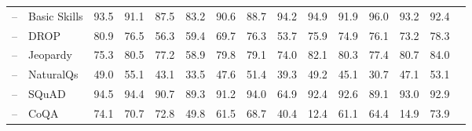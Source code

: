 \documentclass[table]{ai2style/ai2}
\begin{document}
\begin{table}[t]
{{\begin{NiceTabular}{@{}Hl
P{38pt}C{38pt}C{38pt}C{38pt}C{38pt}C{38pt}|C{38pt}C{38pt}C{38pt}C{38pt}C{38pt}C{38pt}H@{}}
 -- & Basic Skills                                                                                           & 93.5                    & 91.1               & 87.5                 & 83.2                 & 90.6                       & 88.7                  & 94.2                  & 94.9                 & 91.9                     & 96.0              & 93.2                 & 92.4                   \\
 -- & DROP                                                                                                   & 80.9                    & 76.5               & 56.3                 & 59.4                 & 69.7                       & 76.3                  & 53.7                  & 75.9                 & 74.9                     & 76.1              & 73.2                 & 78.3                   \\
 -- & Jeopardy                                                                                               & 75.3                    & 80.5               & 77.2                 & 58.9                 & 79.8                       & 79.1                  & 74.0                  & 82.1                 & 80.3                     & 77.4              & 80.7                 & 84.0                   \\
 -- & NaturalQs                                                                                              & 49.0                    & 55.1               & 43.1                 & 33.5                 & 47.6                       & 51.4                  & 39.3                  & 49.2                 & 45.1                     & 30.7              & 47.1                 & 53.1                   \\
 -- & SQuAD                                                                                                  & 94.5                    & 94.4               & 90.7                 & 89.3                 & 91.2                       & 94.0                  & 64.9                  & 92.4                 & 92.6                     & 89.1              & 93.0                 & 92.9                   \\
 -- & CoQA                                                                                                   & 74.1                    & 70.7               & 72.8                 & 49.8                 & 61.5                       & 68.7                  & 40.4                  & 12.4                 & 61.1                     & 64.4              & 14.9                 & 73.9                   \\

\end{NiceTabular}}}
\end{table}
\end{document}
